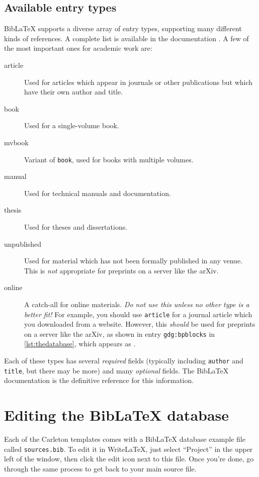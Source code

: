 \documentclass{article}
\newcommand*{\code}[1]{\texttt{#1}}
\begin{document}
\subsection{Available entry types}
\label{s:entrytypes}
Bib\LaTeX{} supports a diverse array of entry types, supporting many different kinds of references.
A complete list is available in the documentation \cite{biblatex}.
A few of the most important ones for academic work are:
\begin{description}
\item[article]
  Used for articles which appear in journals or other publications but which have their own author and title.

\item[book]
  Used for a single-volume book.

\item[mvbook]
  Variant of \code{book}, used for books with multiple volumes.

\item[manual]
  Used for technical manuals and documentation.

\item[thesis]
  Used for theses and dissertations.

\item[unpublished]
  Used for material which has not been formally published in any venue.
  This is \emph{not} appropriate for preprints on a server like the arXiv.

\item[online]
  A catch-all for online materials.
  \emph{Do not use this unless no other type is a better fit!}
  For example, you should use \code{article} for a journal article which you downloaded from a website.
  However, this \emph{should} be used for preprints on a server like the arXiv, as shown in entry \code{gdg:bpblocks} in \cref{lst:thedatabase}, which appears as \cite{gdg:bpblocks}.
\end{description}

Each of these types has several \emph{required} fields (typically including \code{author} and \code{title}, but there may be more) and many \emph{optional} fields.
The Bib\LaTeX{} documentation is the definitive reference for this information.

\section{Editing the Bib\LaTeX{} database}
\label{s:editing}
Each of the Carleton templates comes with a Bib\LaTeX{} database example file called \code{sources.bib}.
To edit it in Write\LaTeX{}, just select \enquote{Project} in the upper left of the window, then click the edit icon next to this file.
Once you're done, go through the same process to get back to your main source file.
\end{document}
